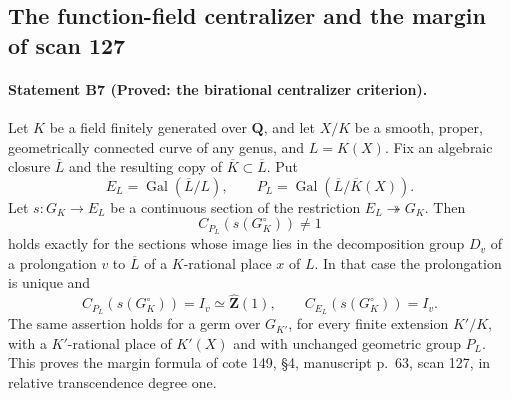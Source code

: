 \subsection{The function-field centralizer and the margin of scan 127}

\paragraph{Statement B7 (Proved: the birational centralizer criterion).}\label{res:B7}
Let $K$ be a field finitely generated over $\mathbf Q$, and let $X/K$ be a smooth, proper, geometrically connected
curve of any genus, and $L=K(X)$. Fix an algebraic closure $\overline L$
and the resulting copy of $\overline K\subset\overline L$. Put
\[
 E_L=\operatorname{Gal}(\overline L/L),\qquad
 P_L=\operatorname{Gal}(\overline L/\overline K(X)).
\]
Let $s:G_K\to E_L$ be a continuous section of the restriction
$E_L\twoheadrightarrow G_K$. Then
\[
 C_{P_L}(s(G_K^\circ))\ne1
\]
holds exactly for the sections whose image lies in the decomposition
group $D_v$ of a prolongation $v$ to $\overline L$ of a $K$-rational place
$x$ of $L$. In that case the prolongation is unique and
\[
 C_{P_L}(s(G_K^\circ))=I_v\simeq\widehat{\mathbf Z}(1),\qquad
 C_{E_L}(s(G_K^\circ))=I_v.
\]
The same assertion holds for a germ over $G_{K'}$, for every finite
extension $K'/K$, with a $K'$-rational place of $K'(X)$ and with unchanged
geometric group $P_L$. This proves the margin formula of cote 149,
\S4, manuscript p.~63, scan 127, in relative transcendence degree one.

